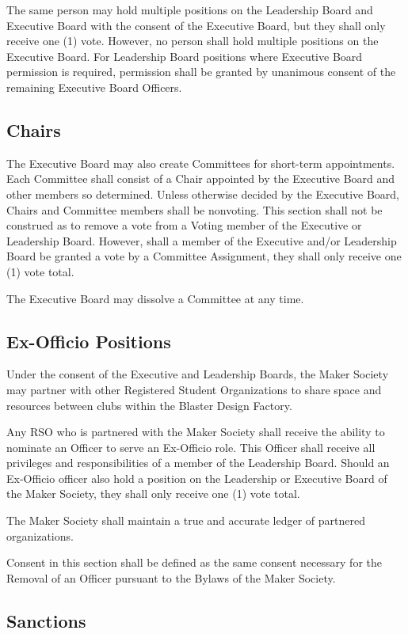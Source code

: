 \documentclass[12pt,letterpaper]{article}
\begin{document}
The same person may hold multiple positions on the Leadership Board and Executive Board with the consent of the Executive Board, but they shall only receive one (1) vote. However, no person shall hold multiple positions on the Executive Board. For Leadership Board positions where Executive Board permission is required, permission shall be granted by unanimous consent of the remaining Executive Board Officers.

\subsection{Chairs}
The Executive Board may also create Committees for short-term appointments. Each Committee shall consist of a Chair appointed by the Executive Board and other members so determined. Unless otherwise decided by the Executive Board, Chairs and Committee members shall be nonvoting. This section shall not be construed as to remove a vote from a Voting member of the Executive or Leadership Board. However, shall a member of the Executive and/or Leadership Board be granted a vote by a Committee Assignment, they shall only receive one (1) vote total.

The Executive Board may dissolve a Committee at any time.

\subsection{Ex-Officio Positions}

Under the consent of the Executive and Leadership Boards, the Maker Society may partner with other Registered Student Organizations to share space and resources between clubs within the Blaster Design Factory.

Any RSO who is partnered with the Maker Society shall receive the ability to nominate an Officer to serve an Ex-Officio role. This Officer shall receive all privileges and responsibilities of a member of the Leadership Board. Should an Ex-Officio officer also hold a position on the Leadership or Executive Board of the Maker Society, they shall only receive one (1) vote total.

The Maker Society shall maintain a true and accurate ledger of partnered organizations.

Consent in this section shall be defined as the same consent necessary for the Removal of an Officer pursuant to the Bylaws of the Maker Society.

\subsection{Sanctions}
\end{document}
